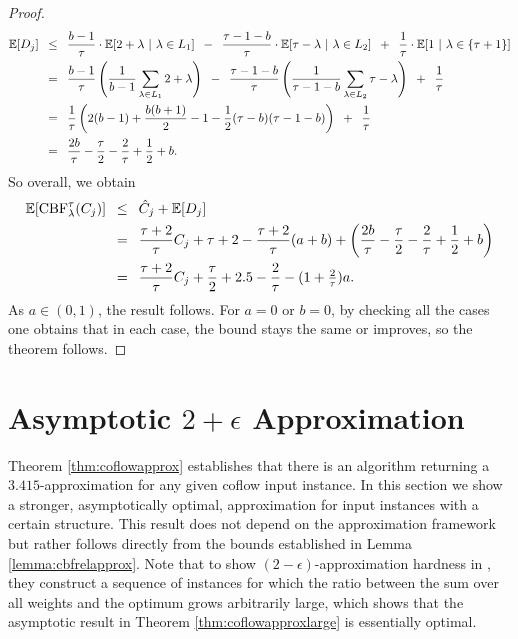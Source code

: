 \documentclass[11pt]{article}
\newcommand{\Hquad}{\hspace{0.5em}}
\begin{document}
\begin{proof}
\begin{align*}
\mathbb{E}[D_j] &\Hquad\le\Hquad \frac{b-1}{\tau}\cdot\mathbb{E}[2+\lambda\ |\ \lambda \in L_1] \Hquad - \Hquad \frac{\tau-1-b}{\tau}\cdot\mathbb{E}[\tau - \lambda\ |\ \lambda \in L_2] \Hquad+\Hquad \frac{1}{\tau}\cdot\mathbb{E}[1\ |\ \lambda \in \{\tau+1\}]\\
~   &\Hquad=\Hquad \frac{b-1}{\tau}\left(\frac{1}{b-1}\sum_{\lambda \in L_1} 2+\lambda\right) \Hquad-\Hquad \frac{\tau-1-b}{\tau}\left(\frac{1}{\tau-1-b}\sum_{\lambda \in L_2}\tau-\lambda\right) \Hquad + \Hquad \frac{1}{\tau}\\
    &\Hquad=\Hquad \frac{1}{\tau} \left(2(b-1) + \frac{b(b+1)}{2} - 1 - \frac{1}{2}(\tau-b)(\tau-1-b)\right) \Hquad + \Hquad \frac{1}{\tau}\\
    &\Hquad=\Hquad \frac{2b}{\tau} - \frac{\tau}{2} - \frac{2}{\tau} + \frac{1}{2} + b.
\end{align*}
So overall, we obtain
\begin{align*}
    \mathbb{E}[\mathrm{CBF}^\tau_\lambda(C_j)] &\Hquad\le\Hquad \hat{C}_j + \mathbb{E}[D_j]\\
    ~&\Hquad=\Hquad \frac{\tau+2}{\tau}C_j + \tau + 2 - \frac{\tau+2}{\tau}(a+b) + \left(\frac{2b}{\tau} - \frac{\tau}{2} - \frac{2}{\tau} + \frac{1}{2} + b\right)\\
    ~&\Hquad=\Hquad \frac{\tau+2}{\tau}C_j + \frac{\tau}{2} + 2.5 - \frac{2}{\tau} - (1+\tfrac{2}{\tau})a.
\end{align*}
As $a \in (0,1)$, the result follows. For $a=0$ or $b=0$, by checking all the cases one obtains that in each case, the bound stays the same or improves, so the theorem follows.\endproof
\end{proof}

\section{Asymptotic $2+\epsilon$ Approximation}\label{sec:asymp}
Theorem \ref{thm:coflowapprox} establishes that there is an algorithm returning a $3.415$-approximation for any given coflow input instance. In this section we show a stronger, asymptotically optimal, approximation for input instances with a certain structure. This result does not depend on the approximation framework but rather follows directly from the bounds established in Lemma \ref{lemma:cbfrelapprox}. Note that to show $(2-\epsilon)$-approximation hardness in \cite{Sachdeva2013}, they construct a sequence of instances for which the ratio between the sum over all weights and the optimum grows arbitrarily large, which shows that the asymptotic result in Theorem \ref{thm:coflowapproxlarge} is essentially optimal.
\end{document}
